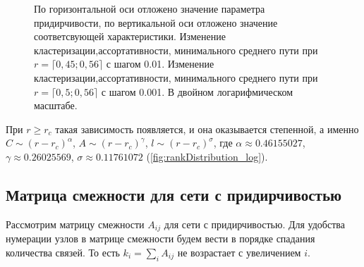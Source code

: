 \documentclass[10pt,aps,pra]{revtex4-1}
\begin{document}
\begin{figure}[H]  

\centering
{}  

\caption{
\label{fig:baCharacteristic}
По горизонтальной оси отложено значение параметра придирчивости, по вертикальной оси отложено значение соответсвующей характеристики.
 Изменение кластеризации,ассортативности, минимального среднего пути при $r=\lceil 0,45; 0,56 \rceil$ с шагом 0.01. 
 Изменение кластеризации,ассортативности, минимального среднего пути при $r=\lceil 0,5; 0,56 \rceil$ с шагом 0.001. В двойном логарифмическом масштабе.
}
\end{figure}

При $r \geq r_c$ такая зависимость появляется, и она оказывается степенной, а именно $C \sim {(r-r_c)}^\alpha$, $A \sim {(r-r_c)}^\gamma$, $l \sim {(r-r_c)}^\sigma$, где $\alpha \approx 0.46155027$, $\gamma \approx 0.26025569$, $\sigma \approx 0.11761072$ (\ref{fig:rankDistribution_log}).

\subsection{Матрица смежности для сети с придирчивостью}
Рассмотрим матрицу смежности $A_{ij}$ для сети с придирчивостью. Для удобства нумерации узлов в матрице смежности будем вести в порядке спадания количества связей. То есть $k_i=\sum\limits_{i}A_{ij}$ не возрастает с увеличением $i$.
\end{document}
